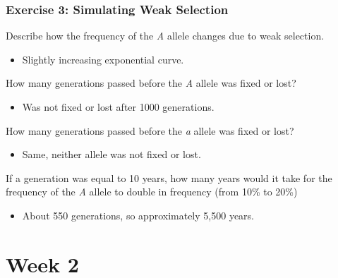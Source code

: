 \documentclass[12pt,a4paper]{article}
\begin{document}
\begin{enumerate}
    \subsubsection*{Exercise 3: Simulating Weak Selection}
    {\color{darklc}\item Describe how the frequency of the \textit{A} allele changes due to weak selection.}
        \begin{itemize}
            \item {\color{pos}Slightly increasing} exponential curve. 
        \end{itemize}
    {\color{darklc}\item How many generations passed before the \textit{A} allele was fixed or lost?}
        \begin{itemize}
            \item Was not fixed or lost after 1000 generations.
        \end{itemize}
    {\color{darklc}\item How many generations passed before the \textit{a} allele was fixed or lost?}
        \begin{itemize}
            \item Same, neither allele was not fixed or lost.
        \end{itemize}
    {\color{darklc}\item If a generation was equal to 10 years, how many years would it take for the frequency of the \textit{A} allele to double in frequency (from 10\% to 20\%)}
        \begin{itemize}
            \item About 550 generations, so approximately {\color{o-Sun}5,500} years.
        \end{itemize}
\end{enumerate}

\clearpage
\section*{Week 2}
{}
\end{document}

